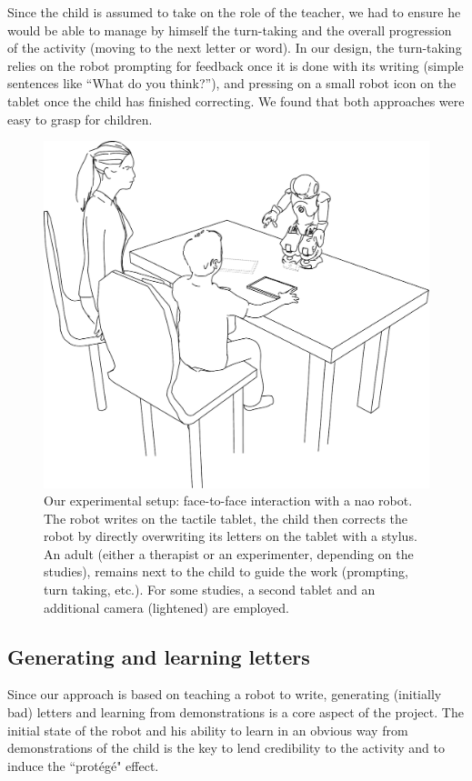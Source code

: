 \documentclass[conference]{IEEEtran}
\begin{document}
Since the child is assumed to take on the role of the teacher, we had to ensure
he would be able to manage by himself the turn-taking and the overall
progression of the activity (moving to the next letter or word). In our design,
the turn-taking relies on the robot prompting for feedback once it is done with
its writing (simple sentences like ``What do you think?''), and pressing on a
small robot icon on the tablet once the child has finished correcting. We found that both approaches were easy to grasp for children.


   \begin{figure}
       \centering
       \includegraphics[width=0.6\columnwidth]{experimental_setup}
       \caption{\small Our experimental setup: face-to-face interaction with a {\sc
           nao} robot.  The robot writes on the tactile tablet, the child then
           corrects the robot by directly overwriting its letters on the tablet
           with a stylus. An adult (either a therapist or an experimenter,
           depending on the studies), remains next to the child to guide the work
           (prompting, turn taking, etc.). For some studies, a second tablet and an
           additional camera (lightened) are employed.}

       \label{experimental_setup}
   \end{figure}

\subsection{Generating and learning letters}
Since our approach is based on teaching a robot to write, generating (initially
bad) letters and learning from demonstrations is a core aspect of the project.
The initial state of the robot and his ability to learn in an obvious way
from demonstrations of the child is the key to lend credibility to the activity and to induce the ``prot\'eg\'e" effect.
\end{document}
